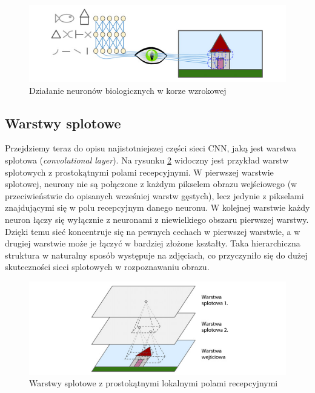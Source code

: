 \documentclass[12pt]{mwbk}
\theoremstyle{plain}
\theoremstyle{definition}
\theoremstyle{remark}
\newcommand\zrodlo[1]{\par\vspace{-3mm}{\small\textit{Źródło: }#1 }}
\begin{document}
\begin{figure}[!h]
	\centering
	\includegraphics[width=\linewidth]{rys/kora_wzrokowa.png}
	\caption{Działanie neuronów biologicznych w korze wzrokowej}
	\zrodlo{\cite{geron}}
	\label{fig:kora-wzrokowa}
\end{figure}


\subsection{Warstwy splotowe}

Przejdziemy teraz do opisu najistotniejszej części sieci CNN, jaką jest warstwa splotowa (\emph{convolutional layer}). Na rysunku \ref{fig:warstwy-cnn} widoczny jest przykład warstw splotowych z prostokątnymi polami recepcyjnymi. W pierwszej warstwie splotowej, neurony nie są połączone z każdym pikselem obrazu wejściowego (w przeciwieństwie do opisanych wcześniej warstw gęstych), lecz jedynie z pikselami znajdującymi się w polu recepcyjnym danego neuronu. W kolejnej warstwie każdy neuron łączy się wyłącznie z neuronami z niewielkiego obszaru pierwszej warstwy. Dzięki temu sieć koncentruje się na pewnych cechach w pierwszej warstwie, a w drugiej warstwie może je łączyć w bardziej złożone kształty. Taka hierarchiczna struktura w naturalny sposób występuje na zdjęciach, co przyczyniło się do dużej skuteczności sieci splotowych w rozpoznawaniu obrazu.

\begin{figure}[!h]
	\centering
	\includegraphics[width=\linewidth]{rys/warstwy_cnn.png}
	\caption{Warstwy splotowe z prostokątnymi lokalnymi polami recepcyjnymi}
	\zrodlo{\cite{geron}}
	\label{fig:warstwy-cnn}
\end{figure}
\end{document}
